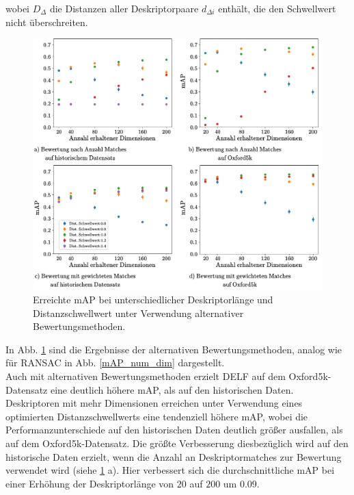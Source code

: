 wobei $D_\Delta$ die Distanzen aller Deskriptorpaare $d_{\Delta i}$ enthält, die den Schwellwert nicht überschreiten.
\begin{figure}[h]
\includegraphics[scale=0.73]{mAp_num_dim_scoring_methods}
\caption{Erreichte mAP bei unterschiedlicher Deskriptorlänge und Distanzschwellwert unter Verwendung alternativer Bewertungsmethoden.}
\label{mAP_num_dim_scoring_methods}
\end{figure}
In Abb. \ref{mAP_num_dim_scoring_methods} sind die Ergebnisse der alternativen Bewertungsmethoden, analog wie für RANSAC in Abb. \ref{mAP_num_dim} dargestellt.\\
Auch mit alternativen Bewertungsmethoden erzielt DELF auf dem Oxford5k-Datensatz eine deutlich höhere mAP, als auf den historischen Daten. 
Deskriptoren mit mehr Dimensionen erreichen unter Verwendung eines optimierten Distanzschwellwerts eine tendenziell höhere mAP, wobei die Performanzunterschiede auf den historischen Daten deutlich größer ausfallen, als auf dem Oxford5k-Datensatz. Die größte Verbesserung diesbezüglich wird auf den historische Daten erzielt, wenn die Anzahl an Deskriptormatches zur Bewertung verwendet wird (siehe \ref{mAP_num_dim_scoring_methods} a). Hier verbessert sich die durchschnittliche mAP bei einer Erhöhung der Deskriptorlänge von $20$ auf $200$  um $0.09$.\\
